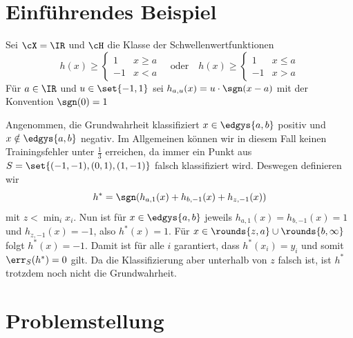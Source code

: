 \documentclass[language=ngerman,algolist,acrolist]{TemplateLecture}
\begin{document}
\section{Einführendes Beispiel}
\begin{expl}\label{expl:boosting}
    Sei $\cX = \IR$ und $\cH$ die Klasse der Schwellenwertfunktionen 
    \begin{equation*}
        h(x) \geq \begin{cases}
            1 & x \geq a \\
            -1 & x < a
        \end{cases} \quad \text{oder} \quad h(x) \geq \begin{cases}
            1 & x \leq a \\ 
            -1 & x > a
        \end{cases}
    \end{equation*}
    Für $a \in \IR$ und $u \in \set{-1, 1}$ sei $h_{a, u}(x) = u \cdot \sgn(x - a)$ mit der Konvention $\sgn(0) = 1$
\end{expl}

Angenommen, die Grundwahrheit klassifiziert $x \in \edgys{a, b}$ positiv und $x \notin \edgys{a, b}$ negativ. Im Allgemeinen können wir in diesem Fall keinen Trainingsfehler unter $\frac{1}{3}$ erreichen, da immer ein Punkt aus $S = \set{(-1, -1), (0, 1), (1, -1)}$ falsch klassifiziert wird. Deswegen definieren wir 
\begin{equation*}
    h^* = \sgn(h_{a,1}(x) + h_{b,-1}(x) + h_{z, -1}(x))
\end{equation*}
mit $z < \min_i x_i$. Nun ist für $x \in \edgys{a,b}$ jeweils $h_{a, 1}(x) = h_{b, -1}(x) = 1$ und $h_{z, -1}(x) = -1$, also $h^*(x) = 1$. Für $x \in \rounds{z, a} \cup \rounds{b, \infty}$ folgt $h^*(x) = -1$. Damit ist für alle $i$ garantiert, dass $h^*(x_i) = y_i$ und somit $\err_S(h^*) = 0$ gilt. Da die Klassifizierung aber unterhalb von $z$ falsch ist, ist $h^*$ trotzdem noch nicht die Grundwahrheit.

\section{Problemstellung}
\end{document}
